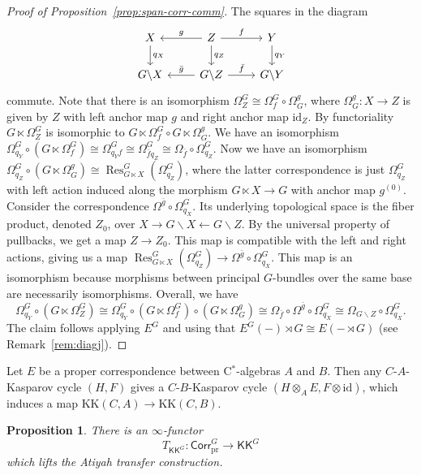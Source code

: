 \documentclass[a4paper,reqno]{amsart}
\theoremstyle{plain}
\newtheorem{proposition}[theorem]{Proposition}
\theoremstyle{definition}
\theoremstyle{remark}
\numberwithin{equation}{section}
\newcommand{\PrCorr}{\mathsf{Corr}_{\mathrm{pr}}}
\newcommand{\id}{\mathrm{id}}
\newcommand{\KK}{\mathrm{KK}}
\newcommand{\icKK}{\mathsf{KK}}
\DeclareMathOperator{\Res}{Res}
\begin{document}
\begin{proof}[Proof of Proposition~\ref{prop:span-corr-comm}]
The squares in the diagram
\[
\begin{tikzcd}
X  \arrow[d, "q_X"] & Z \arrow[l, "g"'] \arrow[r, "f"] \arrow[d, "q_Z"] & Y \arrow[d, "q_Y"] \\
G\backslash X  & G\backslash Z  \arrow[l, "\bar{g}"'] \arrow[r, "\bar{f}"]                 & G\backslash Y               
\end{tikzcd}
\]
commute.
Note that there is an isomorphism $\Omega^G_Z\cong \Omega^G_f\circ \Omega_G^g$, where $\Omega_G^g\colon X\to Z$ is given by $Z$ with left anchor map $g$ and right anchor map $\id_Z$. By functoriality $ G\ltimes \Omega^G_Z$ is isomorphic to $G\ltimes \Omega^G_f\circ G\ltimes \Omega_G^g$. 
We have an isomorphism $\Omega^{G}_{q_Y}\circ (G\ltimes \Omega^G_f) \cong \Omega^G_{q_Y f} \cong \Omega^G_{\bar{f} q_Z}\cong \Omega_{\bar{f}}\circ \Omega^G_{q_Z}$. Now we have an isomorphism $\Omega^G_{q_Z}\circ (G\ltimes \Omega^g_G)\cong \Res^G_{G\ltimes X}(\Omega^G_{q_Z})$, where the latter correspondence is just $\Omega^G_{q_Z}$ with left action induced along the morphism $G\ltimes X \to G$ with anchor map $g^{(0)}$. Consider the correspondence $\Omega^{\bar{g}}\circ \Omega^G_{q_X}$. Its underlying topological space is the fiber product, denoted $Z_0$, over $X \to G\backslash X \leftarrow G\backslash Z$. By the universal property of pullbacks, we get a map $Z\to Z_0$. This map is compatible with the left and right actions, giving us a map $\Res^G_{G\ltimes X}(\Omega^G_{q_Z})\to \Omega^{\bar{g}}\circ \Omega^G_{q_X}$. This map is an isomorphism because morphisms between principal $G$-bundles over the same base are necessarily isomorphisms. Overall, we have
 \[
\Omega^{G}_{q_Y}\circ (G\ltimes \Omega^G_Z) \cong \Omega^{G}_{q_Y}\circ (G\ltimes \Omega^G_f)\circ (G\ltimes \Omega^g_G) \cong \Omega_{\bar{f}}\circ \Omega^{\bar{g}}\circ \Omega^G_{q_X}\cong \Omega_{G\backslash Z}\circ \Omega^G_{q_X}.
\]
The claim follows applying $E^G$ and using that $E^G(-)\rtimes G \cong E(- \rtimes G)$ (see Remark~\ref{rem:diagj}).
\end{proof}

Let $E$ be a proper correspondence between C$^*$-algebras $A$ and $B$.
Then any $C$-$A$-Kasparov cycle $(H, F)$ gives a $C$-$B$-Kasparov cycle $(H \otimes_A E, F \otimes \id)$, which induces a map $\KK(C, A) \to \KK(C, B)$.

\begin{proposition}\label{prop:simplicially-enriched-model-of-atiyah-transfer}
There is an $\infty$-functor 
\[
T_{\icKK^G}\colon \PrCorr^G \to \icKK^G
\]
which lifts the Atiyah transfer construction.
\end{proposition}
\end{document}
